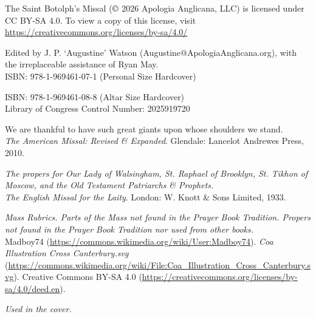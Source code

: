 \thispagestyle{copyrightpage}
\noindent
The Saint Botolph's Missal ($\copyright$ 2026 Apologia Anglicana, LLC) is licensed under CC BY-SA 4.0. To view a copy of this license, visit \url{https://creativecommons.org/licenses/by-sa/4.0/}\\
\par\noindent
Edited by J. P. `Augustine' Watson (Augustine@ApologiaAnglicana.org), with the irreplaceable assistance of Ryan May.\\

ISBN: 978-1-969461-07-1 (Personal Size Hardcover)

ISBN: 978-1-969461-08-8 (Altar Size Hardcover)\\

Library of Congress Control Number: 2025919720\\

\par\noindent
We are thankful to have such great giants upon whose shoulders we stand.\\%

\textit{The American Missal: Revised \& Expanded}. Glendale: Lancelot Andrewes Press, 2010.\par\noindent
\textit{The propers for Our Lady of Walsingham, St. Raphael of Brooklyn, St. Tikhon of Moscow, and the Old Testament Patriarchs \& Prophets.}\\

\textit{The English Missal for the Laity}. London: W. Knott \& Sons Limited, 1933.\par\noindent
\textit{Mass Rubrics. Parts of the Mass not found in the Prayer Book Tradition. Propers not found in the Prayer Book Tradition nor used from other books.}\\


Madboy74 (\url{https://commons.wikimedia.org/wiki/User:Madboy74}). \textit{Coa Illustration Cross Canterbury.svg} (\url{https://commons.wikimedia.org/wiki/File:Coa_Illustration_Cross_Canterbury.svg}). Creative Commons BY-SA 4.0 (\url{https://creativecommons.org/licenses/by-sa/4.0/deed.en}).\par\noindent
\textit{Used in the cover.}%

